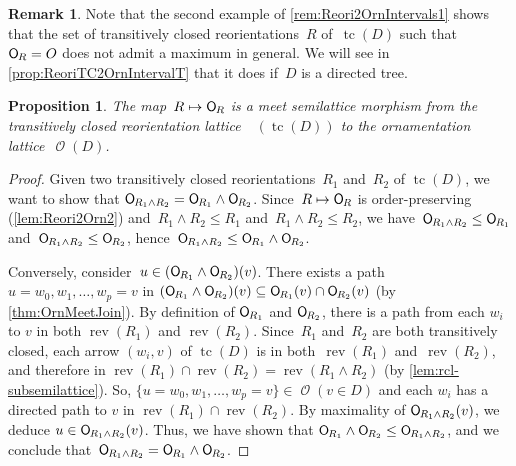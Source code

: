 \documentclass{amsart}
\newtheorem{proposition}[theorem]{Proposition}
\theoremstyle{definition}
\newtheorem{remark}[theorem]{Remark}
\renewcommand{\c}[1]{\mathcal{#1}} %
\DeclareMathOperator{\tc}{tc} %
\newcommand{\vincent}[1]{\todo[size=\tiny,color=blue!30]{ #1 \\ \hfill --- V.}\,}
\newcommand{\meet}{\wedge} %
\newcommand{\mymap}[2]{\mathsf{#1}_{\hspace{-.7pt}#2}}
\DeclareMathOperator{\Orn}{\c{O}}  %
\newcommand{\orn}[1]{\mymap{O}{#1}}  %
\DeclareMathOperator{\Rcl}{\c{R}^{cl}}  %
\DeclareMathOperator{\rev}{rev} %
\begin{document}
\begin{remark}
\label{rem:Reori2OrnIntervals2}
Note that the second example of \cref{rem:Reori2OrnIntervals1} shows that the set of transitively closed reorientations~$R$ of~$\tc(D)$ such that~$\orn{R} = O$ does not admit a maximum in general.
We will see in \cref{prop:ReoriTC2OrnIntervalT} that it does if~$D$ is a directed tree.
\end{remark}

\begin{proposition}
\label{prop:Reori2OrnMeetSemilaticeTC}
The map~$R \mapsto \orn{R}$ is a meet semilattice morphism from the transitively closed reorientation lattice~$\Rcl(\tc(D))$ to the ornamentation lattice~$\Orn(D)$.
\end{proposition}

\begin{proof}
Given two transitively closed reorientations~$R_1$ and~$R_2$ of $\tc(D)$, we want to show that $\orn{R_1 \meet R_2} = \orn{R_1} \meet \orn{R_2}$.
Since~$R \mapsto \orn{R}$ is order-preserving (\cref{lem:Reori2Orn2}) and~$R_1 \meet R_2 \le R_1$ and~$R_1 \meet R_2 \le R_2$, we have~$\orn{R_1 \meet R_2} \le \orn{R_1}$ and~$\orn{R_1 \meet R_2} \le \orn{R_2}$, hence~$\orn{R_1 \meet R_2} \le \orn{R_1} \meet \orn{R_2}$.

Conversely, consider~$u \in (\orn{R_1} \meet \orn{R_2})(v)$.
There exists a path~$u = w_0, w_1, \dots, w_p = v$ in $(\orn{R_1} \meet \orn{R_2})(v) \subseteq \orn{R_1}(v) \cap \orn{R_2}(v)$ (by \cref{thm:OrnMeetJoin}).
By definition of $\orn{R_1}$ and $\orn{R_2}$, there is a path from each $w_i$ to $v$ in both $\rev(R_1)$ and $\rev(R_2)$.
Since~$R_1$ and~$R_2$ are both transitively closed, each arrow $(w_i,v)$ of $\tc(D)$ is in both~$\rev(R_1)$ and~$\rev(R_2)$,
and therefore in $\rev(R_1) \cap \rev(R_2) = \rev(R_1 \meet R_2)$ (by \cref{lem:rcl-subsemilattice}).
So, $\{u = w_0, w_1, \dots, w_p = v\} \in \Orn(v \in D)$ and each $w_i$ has a directed path to $v$ in $\rev(R_1) \cap \rev(R_2)$.
By maximality of $\orn{R_1 \meet R_2}(v)$, we deduce $u \in \orn{R_1 \meet R_2}(v)$.
Thus, we have shown that $\orn{R_1} \meet \orn{R_2} \le \orn{R_1 \meet R_2}$, and we conclude that~$\orn{R_1 \meet R_2} = \orn{R_1} \meet \orn{R_2}$.
%
\end{proof}
\end{document}
